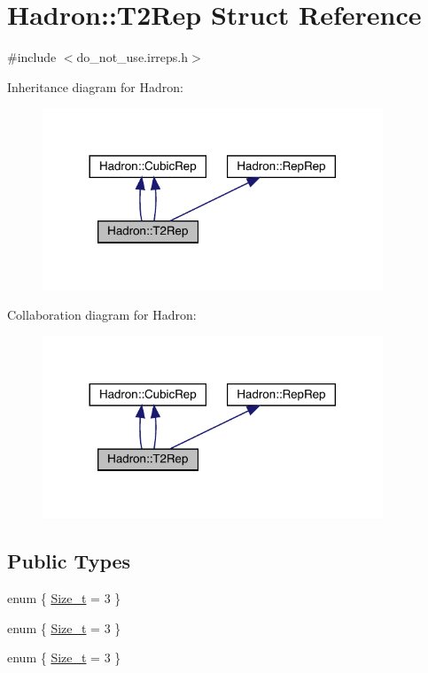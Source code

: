 \hypertarget{structHadron_1_1T2Rep}{}\section{Hadron\+:\+:T2\+Rep Struct Reference}
\label{structHadron_1_1T2Rep}


{\ttfamily \#include $<$do\+\_\+not\+\_\+use.\+irreps.\+h$>$}



Inheritance diagram for Hadron\+:\nopagebreak
\begin{figure}[H]
\begin{center}
\leavevmode
\includegraphics[width=288pt]{d5/df9/structHadron_1_1T2Rep__inherit__graph}
\end{center}
\end{figure}


Collaboration diagram for Hadron\+:\nopagebreak
\begin{figure}[H]
\begin{center}
\leavevmode
\includegraphics[width=288pt]{de/de8/structHadron_1_1T2Rep__coll__graph}
\end{center}
\end{figure}
\subsection*{Public Types}
\begin{DoxyCompactItemize}
\item 
enum \{ \mbox{\hyperlink{structHadron_1_1T2Rep_a14ecc2efafdd4f5ab6800549b8687616a660115eb304ba1dbc8ce3ac7a7aa05c9}{Size\+\_\+t}} = 3
 \}
\item 
enum \{ \mbox{\hyperlink{structHadron_1_1T2Rep_a14ecc2efafdd4f5ab6800549b8687616a660115eb304ba1dbc8ce3ac7a7aa05c9}{Size\+\_\+t}} = 3
 \}
\item 
enum \{ \mbox{\hyperlink{structHadron_1_1T2Rep_a14ecc2efafdd4f5ab6800549b8687616a660115eb304ba1dbc8ce3ac7a7aa05c9}{Size\+\_\+t}} = 3
 \}
\end{DoxyCompactItemize}
